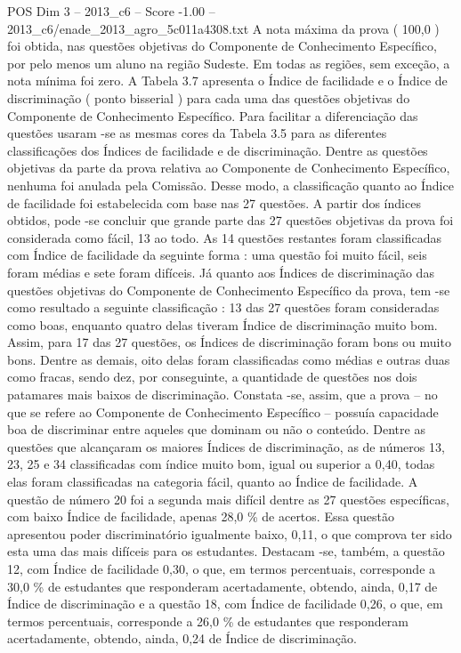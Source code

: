 \begin{textsample}{POS Dim 3 – 2013\_c6 – Score -1.00 – 2013\_c6/enade\_2013\_agro\_5c011a4308.txt}
A nota máxima da prova ( 100,0 ) foi obtida, nas questões objetivas do Componente de Conhecimento Específico, por pelo menos um aluno na região Sudeste.
Em todas as regiões, sem exceção, a nota mínima foi zero.
A Tabela 3.7 apresenta o Índice de facilidade e o Índice de discriminação ( ponto bisserial ) para cada uma das questões objetivas do Componente de Conhecimento Específico.
Para facilitar a diferenciação das questões usaram -se as mesmas cores da Tabela 3.5 para as diferentes classificações dos Índices de facilidade e de discriminação.
Dentre as questões objetivas da parte da prova relativa ao Componente de Conhecimento Específico, nenhuma foi anulada pela Comissão.
Desse modo, a classificação quanto ao Índice de facilidade foi estabelecida com base nas 27 questões.
A partir dos índices obtidos, pode -se concluir que grande parte das 27 questões objetivas da prova foi considerada como fácil, 13 ao todo.
As 14 questões restantes foram classificadas com Índice de facilidade da seguinte forma : uma questão foi muito fácil, seis foram médias e sete foram difíceis.
Já quanto aos Índices de discriminação das questões objetivas do Componente de Conhecimento Específico da prova, tem -se como resultado a seguinte classificação : 13 das 27 questões foram consideradas como boas, enquanto quatro delas tiveram Índice de discriminação muito bom.
Assim, para 17 das 27 questões, os Índices de discriminação foram bons ou muito bons.
Dentre as demais, oito delas foram classificadas como médias e outras duas como fracas, sendo dez, por conseguinte, a quantidade de questões nos dois patamares mais baixos de discriminação.
Constata -se, assim, que a prova – no que se refere ao Componente de Conhecimento Específico – possuía capacidade boa de discriminar entre aqueles que dominam ou não o conteúdo.
Dentre as questões que alcançaram os maiores Índices de discriminação, as de números 13, 23, 25 e 34 classificadas com índice muito bom, igual ou superior a 0,40, todas elas foram classificadas na categoria fácil, quanto ao Índice de facilidade.
A questão de número 20 foi a segunda mais difícil dentre as 27 questões específicas, com baixo Índice de facilidade, apenas 28,0 \% de acertos.
Essa questão apresentou poder discriminatório igualmente baixo, 0,11, o que comprova ter sido esta uma das mais difíceis para os estudantes.
Destacam -se, também, a questão 12, com Índice de facilidade 0,30, o que, em termos percentuais, corresponde a 30,0 \% de estudantes que responderam acertadamente, obtendo, ainda, 0,17 de Índice de discriminação e a questão 18, com Índice de facilidade 0,26, o que, em termos percentuais, corresponde a 26,0 \% de estudantes que responderam acertadamente, obtendo, ainda, 0,24 de Índice de discriminação.

\end{textsample}
